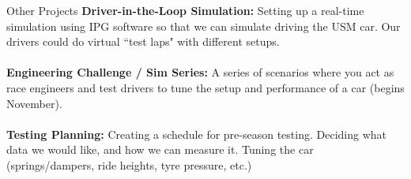 \begin{frame}{Other Projects}
    \textbf{Driver-in-the-Loop Simulation:}
    Setting up a real-time simulation using IPG software
    so that we can simulate driving the USM car.
    Our drivers could do virtual ``test laps" with different setups.
    \\~\\
    \textbf{Engineering Challenge / Sim Series:}
    A series of scenarios where you act as race engineers and test drivers
    to tune the setup and performance of a car (begins November).
    \\~\\
    \textbf{Testing Planning:}
    Creating a schedule for pre-season testing.
    Deciding what data we would like,
    and how we can measure it.
    Tuning the car (springs/dampers, ride heights, tyre pressure, etc.)
\end{frame}